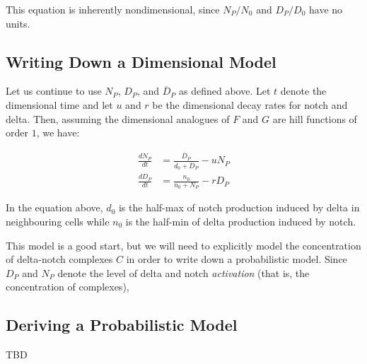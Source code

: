 \documentclass{article}
\begin{document}
\begin{flushleft}
This equation is inherently nondimensional, since $N_{P} / N_{0}$ and $D_{P} / D_{0}$ have no units.

\subsection{Writing Down a Dimensional Model}

Let us continue to use $N_{P}$, $D_{P}$, and $\overline{D}_{P}$ as defined above. Let $t$ denote the dimensional time and let $u$ and $r$ be the dimensional decay rates for notch and delta. Then, assuming the dimensional analogues of $F$ and $G$ are hill functions of order $1$, we have:

$$
\begin{aligned}
  \frac{dN_{P}}{dt} &= \frac{\overline{D}_{P}}{d_{0} + \overline{D}_{P}} - u N_{P} \\[5pt]
  \frac{dD_{P}}{dt} &= \frac{n_{0}}{n_{0} + N_{P}} - rD_{P}
\end{aligned}
$$

In the equation above, $d_{0}$ is the half-max of notch production induced by delta in neighbouring cells while $n_{0}$ is the half-min of delta production induced by notch. 

\medskip

This model is a good start, but we will need to explicitly model the concentration of delta-notch complexes $C$ in order to write down a probabilistic model. Since $D_{P}$ and $N_{P}$ denote the level of delta and notch \emph{activation} (that is, the concentration of complexes), 

\subsection{Deriving a Probabilistic Model}

TBD

\end{flushleft}
\end{document}
